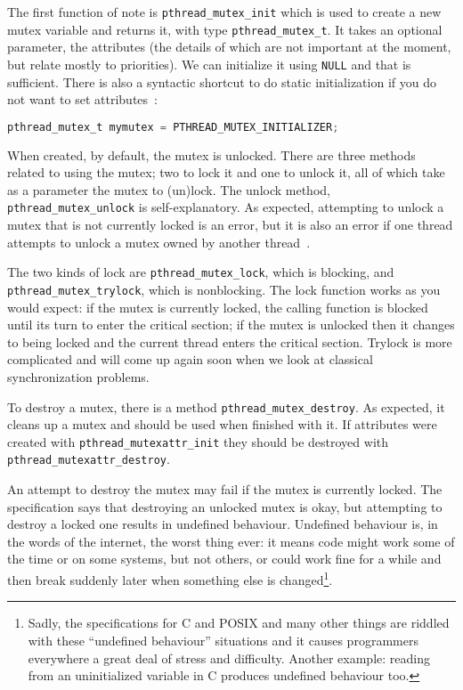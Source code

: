 The first function of note is \texttt{pthread\_mutex\_init} which is used to create a new mutex variable and returns it, with type \texttt{pthread\_mutex\_t}. It takes an optional parameter, the attributes (the details of which are not important at the moment, but relate mostly to priorities). We can initialize it using \texttt{NULL} and that is sufficient. There is also a syntactic shortcut to do static initialization if you do not want to set attributes~\cite{pthreads}:

\begin{lstlisting}[language=C]
pthread_mutex_t mymutex = PTHREAD_MUTEX_INITIALIZER;
\end{lstlisting}

When created, by default, the mutex is unlocked. There are three methods related to using the mutex; two to lock it and one to unlock it, all of which take as a parameter the mutex to (un)lock. The unlock method, \texttt{pthread\_mutex\_unlock} is self-explanatory. As expected, attempting to unlock a mutex that is not currently locked is an error, but it is also an error if one thread attempts to unlock a mutex owned by another thread~\cite{pthreads}.

The two kinds of lock are \texttt{pthread\_mutex\_lock}, which is blocking, and \texttt{pthread\_mutex\_trylock}, which is nonblocking. The lock function works as you would expect: if the mutex is currently locked, the calling function is blocked until its turn to enter the critical section; if the mutex is unlocked then it changes to being locked and the current thread enters the critical section. Trylock is more complicated and will come up again soon when we look at classical synchronization problems.

To destroy a mutex, there is a method \texttt{pthread\_mutex\_destroy}. As expected, it cleans up a mutex and should be used when finished with it. If attributes were created with \texttt{pthread\_mutexattr\_init} they should be destroyed with \texttt{pthread\_mutexattr\_destroy}.

An attempt to destroy the mutex may fail if the mutex is currently locked. The specification says that destroying an unlocked mutex is okay, but attempting to destroy a locked one results in undefined behaviour. Undefined behaviour is, in the words of the internet, the worst thing ever: it means code might work some of the time or on some systems, but not others, or could work fine for a while and then break suddenly later when something else is changed\footnote{Sadly, the specifications for C and POSIX and many other things are riddled with these ``undefined behaviour'' situations and it causes programmers everywhere a great deal of stress and difficulty. Another example: reading from an uninitialized variable in C produces undefined behaviour too.}.


